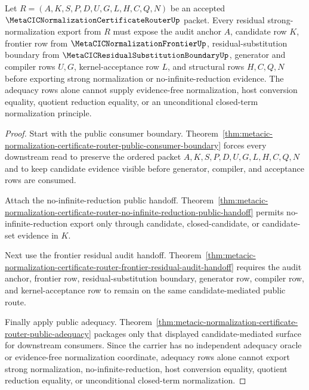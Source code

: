 \begin{theorem}
\label{thm:metacic-residual-sn-candidate-mediated-route}
Let $R=(A,K,S,P,D,U,G,L,H,C,Q,N)$ be an accepted $\MetaCICNormalizationCertificateRouterUp$ packet. Every residual strong-normalization export from $R$ must expose the audit anchor $A$, candidate row $K$, frontier row from $\MetaCICNormalizationFrontierUp$, residual-substitution boundary from $\MetaCICResidualSubstitutionBoundaryUp$, generator and compiler rows $U,G$, kernel-acceptance row $L$, and structural rows $H,C,Q,N$ before exporting strong normalization or no-infinite-reduction evidence. The adequacy rows alone cannot supply evidence-free normalization, host conversion equality, quotient reduction equality, or an unconditional closed-term normalization principle.
\end{theorem}
\begin{proof}
Start with the public consumer boundary. Theorem~\ref{thm:metacic-normalization-certificate-router-public-consumer-boundary} forces every downstream read to preserve the ordered packet $A,K,S,P,D,U,G,L,H,C,Q,N$ and to keep candidate evidence visible before generator, compiler, and acceptance rows are consumed.

Attach the no-infinite-reduction public handoff. Theorem~\ref{thm:metacic-normalization-certificate-router-no-infinite-reduction-public-handoff} permits no-infinite-reduction export only through candidate, closed-candidate, or candidate-set evidence in $K$.

Next use the frontier residual audit handoff. Theorem~\ref{thm:metacic-normalization-certificate-router-frontier-residual-audit-handoff} requires the audit anchor, frontier row, residual-substitution boundary, generator row, compiler row, and kernel-acceptance row to remain on the same candidate-mediated public route.

Finally apply public adequacy. Theorem~\ref{thm:metacic-normalization-certificate-router-public-adequacy} packages only that displayed candidate-mediated surface for downstream consumers. Since the carrier has no independent adequacy oracle or evidence-free normalization coordinate, adequacy rows alone cannot export strong normalization, no-infinite-reduction, host conversion equality, quotient reduction equality, or unconditional closed-term normalization.
\end{proof}

